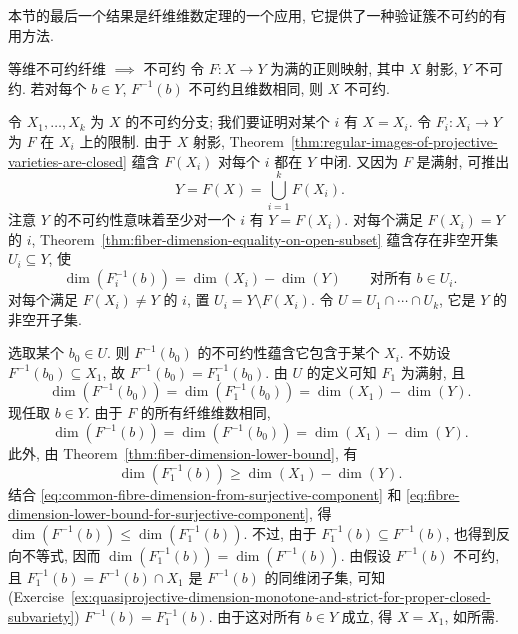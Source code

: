本节的最后一个结果是纤维维数定理的一个应用, 它提供了一种验证簇不可约的有用方法.

\begin{Theorem}{等维不可约纤维 $\implies$ 不可约}\leavevmode\label{thm:projective-domain-irreducible-from-equidimensional-irreducible-fibres}
令 $F:X\to Y$ 为满的正则映射, 其中 $X$ 射影, $Y$ 不可约. 若对每个 $b\in Y$, $F^{-1}(b)$ 不可约且维数相同, 则 $X$ 不可约.
\end{Theorem}
\begin{Proof}
令 $X_{1},\ldots,X_{k}$ 为 $X$ 的不可约分支; 我们要证明对某个 $i$ 有 $X=X_{i}$. 令 $F_{i}:X_{i}\to Y$ 为 $F$ 在 $X_{i}$ 上的限制. 由于 $X$ 射影, Theorem~\ref{thm:regular-images-of-projective-varieties-are-closed} 蕴含 $F(X_{i})$ 对每个 $i$ 都在 $Y$ 中闭. 又因为 $F$ 是满射, 可推出
\[
  Y=F(X)=\bigcup_{i=1}^{k}F(X_{i}).
\]
注意 $Y$ 的不可约性意味着至少对一个 $i$ 有 $Y=F(X_{i})$. 对每个满足 $F(X_{i})=Y$ 的 $i$, Theorem~\ref{thm:fiber-dimension-equality-on-open-subset} 蕴含存在非空开集 $U_{i}\subseteq Y$, 使
\[
  \dim(F_{i}^{-1}(b))=\dim(X_{i})-\dim(Y)\qquad\text{对所有 }b\in U_{i}.
\]
对每个满足 $F(X_{i})\ne Y$ 的 $i$, 置 $U_{i}=Y\setminus F(X_{i})$. 令 $U=U_{1}\cap\cdots\cap U_{k}$, 它是 $Y$ 的非空开子集.

选取某个 $b_{0}\in U$. 则 $F^{-1}(b_{0})$ 的不可约性蕴含它包含于某个 $X_{i}$. 不妨设 $F^{-1}(b_{0})\subseteq X_{1}$, 故 $F^{-1}(b_{0})=F_{1}^{-1}(b_{0})$. 由 $U$ 的定义可知 $F_{1}$ 为满射, 且
\[
  \dim(F^{-1}(b_{0}))=\dim(F_{1}^{-1}(b_{0}))=\dim(X_{1})-\dim(Y).
\]
现任取 $b\in Y$. 由于 $F$ 的所有纤维维数相同,
\begin{equation}\label{eq:common-fibre-dimension-from-surjective-component}
  \dim(F^{-1}(b))=\dim(F^{-1}(b_{0}))=\dim(X_{1})-\dim(Y).
\end{equation}
此外, 由 Theorem~\ref{thm:fiber-dimension-lower-bound}, 有
\begin{equation}\label{eq:fibre-dimension-lower-bound-for-surjective-component}
  \dim(F_{1}^{-1}(b))\ge\dim(X_{1})-\dim(Y).
\end{equation}
结合 \eqref{eq:common-fibre-dimension-from-surjective-component} 和 \eqref{eq:fibre-dimension-lower-bound-for-surjective-component}, 得 $\dim(F^{-1}(b))\le\dim(F_{1}^{-1}(b))$. 不过, 由于 $F_{1}^{-1}(b)\subseteq F^{-1}(b)$, 也得到反向不等式, 因而 $\dim(F_{1}^{-1}(b))=\dim(F^{-1}(b))$. 由假设 $F^{-1}(b)$ 不可约, 且 $F_{1}^{-1}(b)=F^{-1}(b)\cap X_{1}$ 是 $F^{-1}(b)$ 的同维闭子集, 可知 (Exercise~\ref{ex:quasiprojective-dimension-monotone-and-strict-for-proper-closed-subvariety}) $F^{-1}(b)=F_{1}^{-1}(b)$. 由于这对所有 $b\in Y$ 成立, 得 $X=X_{1}$, 如所需.
\end{Proof}

